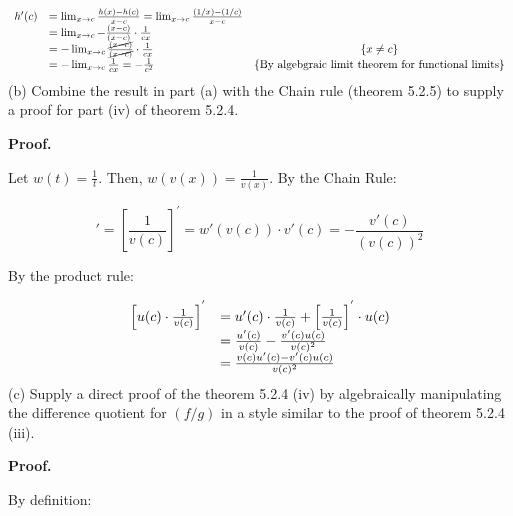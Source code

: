 \documentclass[10pt]{article}
\begin{document}
\begin{equation*}
\begin{array}{ r l c }
h'( c) & =\lim _{x\rightarrow c}\frac{h( x) -h( c)}{x-c} =\lim _{x\rightarrow c}\frac{( 1/x) -( 1/c)}{x-c} & \\
 & =\lim _{x\rightarrow c} -\frac{( x-c)}{( x-c)} \cdot \frac{1}{cx} & \\
 & =-\lim _{x\rightarrow c}\frac{\cancel{( x-c)}}{\cancel{( x-c)}} \cdot \frac{1}{cx} & \{x\neq c\}\\
 & =-\lim _{x\rightarrow c}\frac{1}{cx} =-\frac{1}{c^{2}} & \left\{\text{By algebgraic limit theorem

for functional limits}\right\}
\end{array}
\end{equation*}
(b) Combine the result in part (a) with the Chain rule (theorem 5.2.5) to supply a proof for part (iv) of theorem 5.2.4. 



\textbf{Proof.}



Let $\displaystyle w( t) =\frac{1}{t}$. Then, $\displaystyle w( v( x)) =\frac{1}{v( x)}$. By the Chain Rule:


\begin{equation*}
[ w( v( c))] '=\left[\frac{1}{v( c)}\right]^{'} =w'( v( c)) \cdot v'( c) =-\frac{v'( c)}{( v( c))^{2}}
\end{equation*}
 

By the product rule:


\begin{equation*}
\begin{array}{ c l }
\left[ u( c) \cdot \frac{1}{v( c)}\right]^{'} & =u'( c) \cdot \frac{1}{v( c)} +\left[\frac{1}{v( c)}\right]^{'} \cdot u( c)\\
 & =\frac{u'( c)}{v( c)} -\frac{v'( c) u( c)}{v( c)^{2}}\\
 & =\frac{v( c) u'( c) -v'( c) u( c)}{v( c)^{2}}
\end{array}
\end{equation*}
(c) Supply a direct proof of the theorem 5.2.4 (iv) by algebraically manipulating the difference quotient for $\displaystyle ( f/g)$ in a style similar to the proof of theorem 5.2.4 (iii).



\textbf{Proof.}



By definition:
\end{document}
